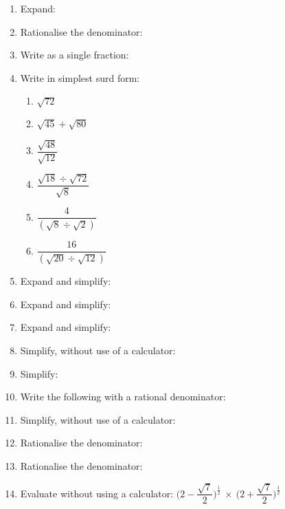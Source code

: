 
\begin{eocexercises}{}
\begin{enumerate}
\item{Expand:
}
\item{Rationalise the denominator:
}
\item{Write as a single fraction:
}
\item{Write in simplest surd form:

\begin{enumerate}
\item $\sqrt{72}$ 
\item $\sqrt{45} + \sqrt{80}$ \\
\item $\dfrac{\sqrt{48}}{\sqrt{12}}$\\
\item $\dfrac{\sqrt{18} \div \sqrt{72}}{\sqrt{8}}$\\
\item $\dfrac{4}{(\sqrt{8} \div \sqrt{2})}$ 
\item$\dfrac{16}{(\sqrt{20} \div \sqrt{12})}$\\
\end{enumerate}

}
\item{Expand and simplify:
}
\item{Expand and simplify:
}
\item{Expand and simplify:
}
\item{Simplify, without use of a calculator:
}
\item{Simplify:
}
\item{Write the following with a rational denominator:
}
\item{Simplify, without use of a calculator:
}

\item{Rationalise the denominator:
}
\item{Rationalise the denominator:
}
\item{Evaluate without using a calculator: $\biggl(2 - \dfrac{\sqrt{7}}{2}\biggr)^{\tfrac{1}{2}} \: \times \: \biggl(2 + \dfrac{\sqrt{7}}{2}\biggr)^{\tfrac{1}{2}}$} 


\end{enumerate}
\end{eocexercises}

